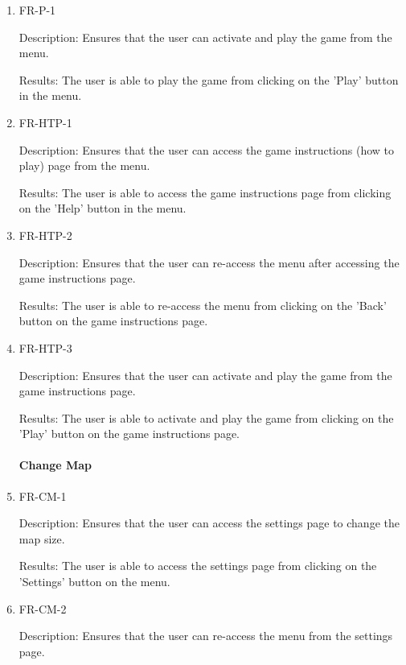 \documentclass[12pt, titlepage]{article}
\begin{document}
\begin{enumerate}

\item{FR-P-1\\}
\label{fr:p-1}	
			
Description: Ensures that the user can activate and play the game from the menu.

Results: The user is able to play the game from clicking on the 'Play' button in the menu.
		
\item{FR-HTP-1\\}
\label{fr:htp-1}				

Description: Ensures that the user can access the game instructions (how to play) page from the menu.

Results: The user is able to access the game instructions page from clicking on the 'Help' button in the menu.

\item{FR-HTP-2}
\label{fr:htp-2}

Description: Ensures that the user can re-access the menu after accessing the game instructions page.

Results: The user is able to re-access the menu from clicking on the 'Back' button on the game instructions page.

\item{FR-HTP-3}
\label{fr:htp-3}

Description: Ensures that the user can activate and play the game from the game instructions page.

Results: The user is able to activate and play the game from clicking on the 'Play' button on the game instructions page.

\paragraph{Change Map}

\item{FR-CM-1}
\label{fr:cm-1}

Description: Ensures that the user can access the settings page to change the map size.

Results: The user is able to access the settings page from clicking on the 'Settings' button on the menu.

\item{FR-CM-2}
\label{fr:cm-2}

Description: Ensures that the user can re-access the menu from the settings page.


\end{enumerate}
\end{document}
